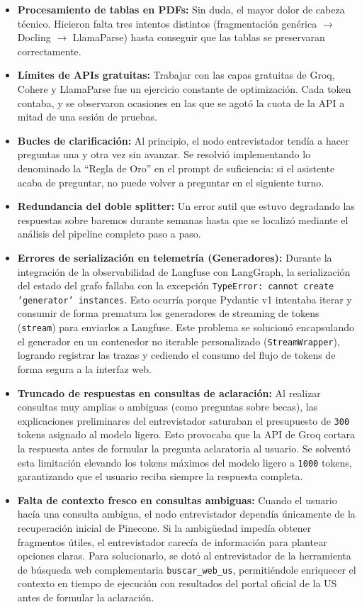 \documentclass[12pt,a4paper,oneside]{report}
\begin{document}
\begin{itemize}
    \item \textbf{Procesamiento de tablas en PDFs:} Sin duda, el mayor dolor de cabeza técnico. Hicieron falta tres intentos distintos (fragmentación genérica $\rightarrow$ Docling $\rightarrow$ LlamaParse) hasta conseguir que las tablas se preservaran correctamente.
    \item \textbf{Límites de APIs gratuitas:} Trabajar con las capas gratuitas de Groq, Cohere y LlamaParse fue un ejercicio constante de optimización. Cada token contaba, y se observaron ocasiones en las que se agotó la cuota de la API a mitad de una sesión de pruebas.
    \item \textbf{Bucles de clarificación:} Al principio, el nodo entrevistador tendía a hacer preguntas una y otra vez sin avanzar. Se resolvió implementando lo denominado la ``Regla de Oro'' en el prompt de suficiencia: si el asistente acaba de preguntar, no puede volver a preguntar en el siguiente turno.
    \item \textbf{Redundancia del doble splitter:} Un error sutil que estuvo degradando las respuestas sobre baremos durante semanas hasta que se localizó mediante el análisis del pipeline completo paso a paso.
    \item \textbf{Errores de serialización en telemetría (Generadores):} Durante la integración de la observabilidad de Langfuse con LangGraph, la serialización del estado del grafo fallaba con la excepción \texttt{TypeError: cannot create 'generator' instances}. Esto ocurría porque Pydantic v1 intentaba iterar y consumir de forma prematura los generadores de streaming de tokens (\texttt{stream}) para enviarlos a Langfuse. Este problema se solucionó encapsulando el generador en un contenedor no iterable personalizado (\texttt{StreamWrapper}), logrando registrar las trazas y cediendo el consumo del flujo de tokens de forma segura a la interfaz web.
    \item \textbf{Truncado de respuestas en consultas de aclaración:} Al realizar consultas muy amplias o ambiguas (como preguntas sobre becas), las explicaciones preliminares del entrevistador saturaban el presupuesto de \texttt{300} tokens asignado al modelo ligero. Esto provocaba que la API de Groq cortara la respuesta antes de formular la pregunta aclaratoria al usuario. Se solventó esta limitación elevando los tokens máximos del modelo ligero a \texttt{1000} tokens, garantizando que el usuario reciba siempre la respuesta completa.
    \item \textbf{Falta de contexto fresco en consultas ambiguas:} Cuando el usuario hacía una consulta ambigua, el nodo entrevistador dependía únicamente de la recuperación inicial de Pinecone. Si la ambigüedad impedía obtener fragmentos útiles, el entrevistador carecía de información para plantear opciones claras. Para solucionarlo, se dotó al entrevistador de la herramienta de búsqueda web complementaria \texttt{buscar\_web\_us}, permitiéndole enriquecer el contexto en tiempo de ejecución con resultados del portal oficial de la US antes de formular la aclaración.

\end{itemize}
\end{document}
